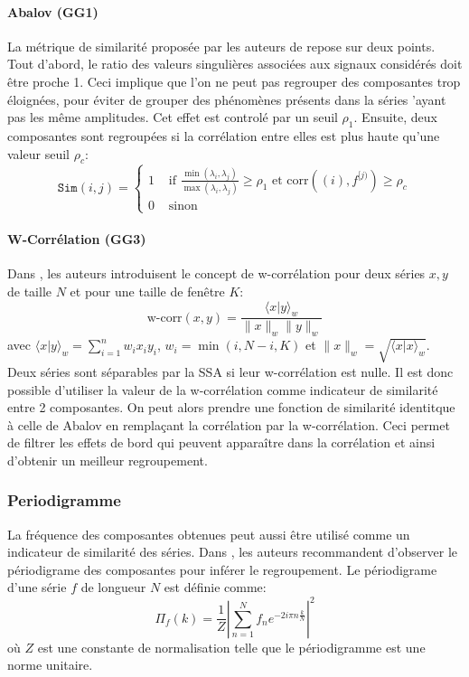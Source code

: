 \documentclass{gretsi}
\begin{document}
\paragraph{Abalov (GG1)}
\label{par:}
La métrique de similarité proposée par les auteurs de \cite{abalov_14_aut} repose sur deux points. Tout d'abord, le ratio des valeurs singulières associées aux signaux considérés doit être proche 1. Ceci implique que l'on ne peut pas regrouper des composantes trop éloignées, pour éviter de grouper des phénomènes présents dans la séries 'ayant pas les même amplitudes. Cet effet est controlé par un seuil $\rho_1$. Ensuite, deux composantes sont regroupées si la corrélation entre elles est plus haute qu'une valeur seuil $\rho_c$:
$$
\texttt{Sim}(i, j) = \begin{cases}
	1 &\text{ if } \displaystyle\frac{\min(\lambda_i, \lambda_j)}{\max(\lambda_i, \lambda_j)} \ge \rho_1 \text{ et } \text{corr}({(i)}, f^{[j)}) \ge \rho_c\\
	0& \text{ sinon}
\end{cases}
$$

\paragraph{W-Corrélation (GG3)}
\label{par:nn}

Dans \cite{GNZ_10_SSA}, les auteurs introduisent le concept de w-corrélation pour deux séries $x, y$ de taille $N$ et pour une taille de fenêtre $K$:$$
\text{w-corr}(x, y) = \frac{\langle x|y\rangle_w}{\|x\|_w\|y\|_w}
$$avec $\langle x|y\rangle_w = \sum_{i=1}^n w_i x_i y_i$, $w_i = \min(i, N-i, K)$ et $\|x\|_w = \sqrt{\langle x|x\rangle_w}$. Deux séries sont séparables par la SSA si leur w-corrélation est nulle. Il est donc possible d'utiliser la valeur de la w-corrélation comme indicateur de similarité entre 2 composantes. On peut alors prendre une fonction de similarité identitque à celle de Abalov en remplaçant la corrélation par la w-corrélation. Ceci permet de filtrer les effets de bord qui peuvent apparaître dans la corrélation et ainsi d'obtenir un meilleur regroupement.


\subsubsection{Periodigramme}

La fréquence des composantes obtenues peut aussi être utilisé comme un indicateur de similarité des séries. Dans \cite{GNZ_10_SSA}, les auteurs recommandent d'observer le périodigrame des composantes pour inférer le regroupement. Le périodigrame d'une série $f$ de longueur $N$ est définie comme:$$
\Pi_f(k) = \frac{1}{Z}\left|\sum_{n=1}^N f_n e^{-2i\pi n \frac{k}{N}}\right|^2
$$ où $Z$ est une constante de normalisation telle que le périodigramme est une norme unitaire.\\
\end{document}
